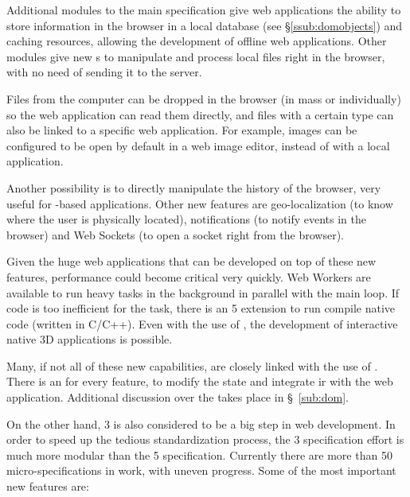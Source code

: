 Additional modules to the main specification give web applications the ability to store information in the browser in a local database (see \S\vref{ssub:domobjects}) and caching resources, allowing the development of offline web applications.
Other modules give new s to manipulate and process local files right in the browser, with no need of sending it to the server.

Files from the computer can be dropped in the browser (in mass or individually) so the web application can read them directly, and files with a certain  type can also be linked to a specific web application.
For example, images can be configured to be open by default in a web image editor, instead of with a local application.

Another possibility is to directly manipulate the history of the browser, very useful for -based applications.
Other new features are geo-localization (to know where the user is physically located), notifications (to notify events in the browser) and Web Sockets (to open a socket right from the browser).

Given the huge web applications that can be developed on top of these new features, performance could become critical very quickly.
Web Workers are available to run heavy tasks in the background in parallel with the main loop.
If  code is too inefficient for the task, there is an  5 extension to run compile native code (written in C/C++).
Even with the use of , the development of interactive native 3D applications is possible.

Many, if not all of these new capabilities, are closely linked with the use of .
There is an  for every feature, to modify the state and integrate ir with the web application.
Additional discussion over the  takes place in \S~\ref{sub:dom}.

On the other hand,  3 is also considered to be a big step in web development.
In order to speed up the tedious standardization process, the  3 specification effort is much more modular than the  5 specification.
Currently there are more than 50 micro-specifications in work, with uneven progress.
Some of the most important new features are:

